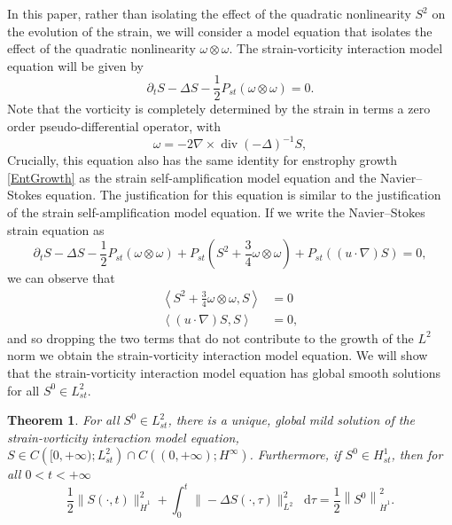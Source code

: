 \documentclass[11pt]{article}
\theoremstyle{plain}
\newtheorem{theorem}{Theorem}[section]
\theoremstyle{remark}
\numberwithin{equation}{section}
\newcommand{\diff}{\mathop{}\!\mathrm{d}}
\DeclareMathOperator*{\divr}{div}
\begin{document}
In this paper, rather than isolating the effect of the quadratic nonlinearity $S^2$ on the evolution of the strain, we will consider a model equation that isolates the effect of the quadratic nonlinearity $\omega\otimes\omega$. The strain-vorticity interaction model equation will be given by
\begin{equation} \label{StrainVortModel}
 \partial_t S-\Delta S -\frac{1}{2}P_{st}
 \left( \omega\otimes\omega \right)=0.   
\end{equation}
Note that the vorticity is completely determined by the strain in terms a zero order pseudo-differential operator, with
\begin{equation} \label{VortStrainID}
\omega=-2\nabla \times \divr (-\Delta)^{-1}S,
\end{equation}
Crucially, this equation also has the same identity for enstrophy growth \eqref{EntGrowth} as the strain self-amplification model equation and the Navier--Stokes equation.
The justification for this equation is similar to the justification of the strain self-amplification model equation. If we write the Navier--Stokes strain equation as
\begin{equation}
    \partial_t S-\Delta S-\frac{1}{2}P_{st}
    \left(\omega\otimes\omega\right)
    +P_{st}\left(S^2+\frac{3}{4}\omega\otimes\omega\right)
    +P_{st}\left((u\cdot\nabla)S\right)=0,
\end{equation}
we can observe that
\begin{align}
    \left<S^2+\frac{3}{4}\omega\otimes\omega,
    S\right> &=0 \\
    \left<(u\cdot\nabla)S,S\right> &=0,
\end{align}
and so dropping the two terms that do not contribute to the growth of the $L^2$ norm we obtain the strain-vorticity interaction model equation.
We will show that the strain-vorticity interaction model equation has global smooth solutions for all $S^0\in L^2_{st}$.

\begin{theorem} \label{StrainVortGlobalExistIntro}
For all $S^0 \in L^2_{st}$, there is a unique, global mild solution of the strain-vorticity interaction model equation,
$S\in C\left([0,+\infty);L^2_{st}\right) \cap 
C\left((0,+\infty);H^\infty\right)$.
Furthermore, if $S^0\in H^1_{st}$,
then for all $0<t<+\infty$
\begin{equation}
    \frac{1}{2}\|S(\cdot,t)\|_{\dot{H}^1}^2+
    \int_0^t\|-\Delta S(\cdot,\tau)\|_{L^2}^2 \diff\tau
    =
    \frac{1}{2}\left\|S^0\right\|_{\dot{H}^1}^2.
\end{equation}
\end{theorem}
\end{document}
